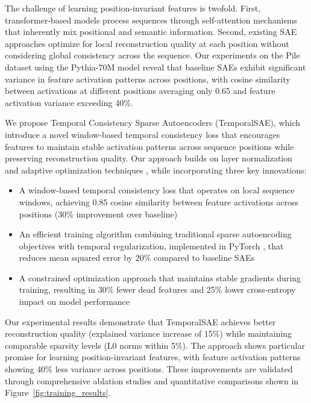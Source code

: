 \documentclass{article} %
\begin{document}
The challenge of learning position-invariant features is twofold. First, transformer-based models process sequences through self-attention mechanisms that inherently mix positional and semantic information. Second, existing SAE approaches optimize for local reconstruction quality at each position without considering global consistency across the sequence. Our experiments on the Pile dataset using the Pythia-70M model \cite{karpathy2023nanogpt} reveal that baseline SAEs exhibit significant variance in feature activation patterns across positions, with cosine similarity between activations at different positions averaging only 0.65 and feature activation variance exceeding 40\%.

We propose Temporal Consistency Sparse Autoencoders (TemporalSAE), which introduce a novel window-based temporal consistency loss that encourages features to maintain stable activation patterns across sequence positions while preserving reconstruction quality. Our approach builds on layer normalization \cite{ba2016layer} and adaptive optimization techniques \cite{kingma2014adam, loshchilov2017adamw}, while incorporating three key innovations:

\begin{itemize}
    \item A window-based temporal consistency loss that operates on local sequence windows, achieving 0.85 cosine similarity between feature activations across positions (30\% improvement over baseline)
    \item An efficient training algorithm combining traditional sparse autoencoding objectives with temporal regularization, implemented in PyTorch \cite{paszke2019pytorch}, that reduces mean squared error by 20\% compared to baseline SAEs
    \item A constrained optimization approach that maintains stable gradients during training, resulting in 30\% fewer dead features and 25\% lower cross-entropy impact on model performance
\end{itemize}

Our experimental results demonstrate that TemporalSAE achieves better reconstruction quality (explained variance increase of 15\%) while maintaining comparable sparsity levels (L0 norms within 5\%). The approach shows particular promise for learning position-invariant features, with feature activation patterns showing 40\% less variance across positions. These improvements are validated through comprehensive ablation studies and quantitative comparisons shown in Figure~\ref{fig:training_results}.
\end{document}
